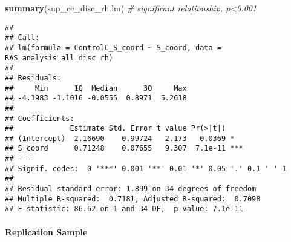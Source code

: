\documentclass[
]{article}
\newenvironment{Shaded}{\begin{snugshade}}{\end{snugshade}}
\newcommand{\CommentTok}[1]{\textcolor[rgb]{0.56,0.35,0.01}{\textit{#1}}}
\newcommand{\DataTypeTok}[1]{\textcolor[rgb]{0.13,0.29,0.53}{#1}}
\newcommand{\KeywordTok}[1]{\textcolor[rgb]{0.13,0.29,0.53}{\textbf{#1}}}
\newcommand{\NormalTok}[1]{#1}
\newcommand{\OperatorTok}[1]{\textcolor[rgb]{0.81,0.36,0.00}{\textbf{#1}}}
\newcommand{\StringTok}[1]{\textcolor[rgb]{0.31,0.60,0.02}{#1}}
\begin{document}
\begin{Shaded}
\begin{Highlighting}[]
\KeywordTok{summary}\NormalTok{(sup_cc_disc_rh.lm) }\CommentTok{# significant relationship, p<0.001}
\end{Highlighting}
\end{Shaded}

\begin{verbatim}
## 
## Call:
## lm(formula = ControlC_S_coord ~ S_coord, data = RAS_analysis_all_disc_rh)
## 
## Residuals:
##     Min      1Q  Median      3Q     Max 
## -4.1983 -1.1016 -0.0555  0.8971  5.2618 
## 
## Coefficients:
##             Estimate Std. Error t value Pr(>|t|)    
## (Intercept)  2.16690    0.99724   2.173   0.0369 *  
## S_coord      0.71248    0.07655   9.307  7.1e-11 ***
## ---
## Signif. codes:  0 '***' 0.001 '**' 0.01 '*' 0.05 '.' 0.1 ' ' 1
## 
## Residual standard error: 1.899 on 34 degrees of freedom
## Multiple R-squared:  0.7181, Adjusted R-squared:  0.7098 
## F-statistic: 86.62 on 1 and 34 DF,  p-value: 7.1e-11
\end{verbatim}

\hypertarget{replication-sample-4}{%
\paragraph{Replication Sample}\label{replication-sample-4}}

\begin{Shaded}
\end{Shaded}
\end{document}

